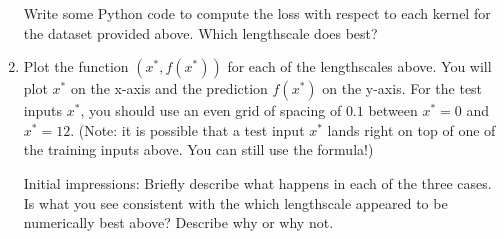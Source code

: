 \documentclass[submit]{harvardml}
\begin{document}
\begin{problem}
\begin{enumerate}
Write some Python code to compute the loss with respect to each kernel
for the dataset provided above. Which lengthscale does best?
  
\item Plot the function $(x^*, f(x^*))$ for each of the
  lengthscales above.  You will plot $x^*$ on the x-axis and the
  prediction $f(x^*)$ on the y-axis.  For the test inputs $x^*$, you
  should use an even grid of spacing of $0.1$ between $x^* = 0$ and
  $x^* = 12$.  (Note: it is possible that a test input $x^*$ lands
  right on top of one of the training inputs above.  You can still use
  the formula!) 

  Initial impressions: Briefly describe what happens in each of the
  three cases.  Is what you see consistent with the which lengthscale
  appeared to be numerically best above?  Describe why or why not.

\end{enumerate}

\end{problem}

\newpage
\end{document}
